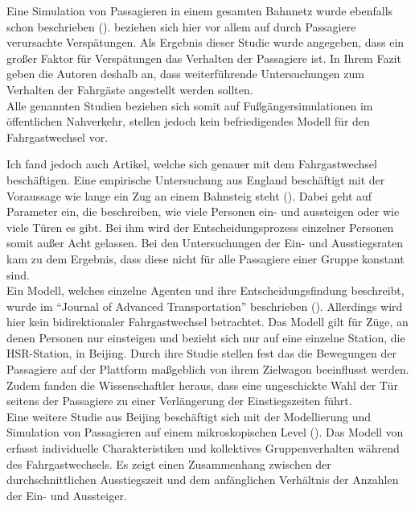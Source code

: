 Eine Simulation von Passagieren in einem gesamten Bahnnetz wurde ebenfalls schon beschrieben (\cite{Albert.2018}). \cite{Albert.2018} beziehen sich hier vor allem auf durch Passagiere verursachte Verspätungen. Als Ergebnis dieser Studie wurde angegeben, dass ein großer Faktor für Verspätungen das Verhalten der Passagiere ist. In Ihrem Fazit geben die Autoren deshalb an, dass weiterführende Untersuchungen zum Verhalten der Fahrgäste angestellt werden sollten. \\
Alle genannten Studien beziehen sich somit auf Fußgängersimulationen im öffentlichen Nahverkehr, stellen jedoch kein befriedigendes Modell für den Fahrgastwechsel vor.

Ich fand jedoch auch Artikel, welche sich genauer mit dem Fahrgastwechsel beschäftigen. Eine empirische Untersuchung aus England beschäftigt mit der Voraussage wie lange ein Zug an einem Bahnsteig steht (\cite{Harris.2006}). Dabei geht \cite{Harris.2006} auf Parameter ein, die \zB beschreiben, wie viele Personen ein- und aussteigen oder wie viele Türen es gibt. Bei ihm wird der Entscheidungsprozess einzelner Personen somit außer Acht gelassen. Bei den Untersuchungen der Ein- und Ausstiegsraten kam \cite{Harris.2006} zu dem Ergebnis, dass diese nicht für alle Passagiere einer Gruppe konstant sind. \\
Ein Modell, welches einzelne Agenten und ihre Entscheidungsfindung beschreibt, wurde im "`Journal of Advanced Transportation"' beschrieben (\cite{Tang.2017}). Allerdings wird hier kein bidirektionaler Fahrgastwechsel betrachtet. Das Modell gilt für Züge, an denen Personen nur einsteigen und bezieht sich nur auf eine einzelne Station, die HSR-Station, in Beijing. Durch ihre Studie stellen \cite{Tang.2017} fest das die Bewegungen der Passagiere auf der Plattform maßgeblich von ihrem Zielwagon beeinflusst werden. Zudem fanden die Wissenschaftler heraus, dass eine ungeschickte Wahl der Tür seitens der Passagiere zu einer Verlängerung der Einstiegszeiten führt.\\
Eine weitere Studie aus Beijing beschäftigt sich mit der Modellierung und Simulation von Passagieren auf einem mikroskopischen Level (\cite{Zhang.2008}). Das Modell von \cite{Zhang.2008} erfasst individuelle Charakteristiken und kollektives Gruppenverhalten während des Fahrgastwechsels. Es zeigt einen Zusammenhang zwischen der durchschnittlichen Ausstiegszeit und dem anfänglichen Verhältnis der Anzahlen der Ein- und Aussteiger.

